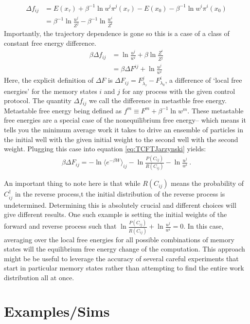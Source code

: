 \documentclass[paper=a4, fontsize=10pt]{article} %
\numberwithin{equation}{section} %
\numberwithin{figure}{section} %
\numberwithin{table}{section} %
\def\avg#1{\langle #1 \rangle}
\begin{document}
\begin{align}
 \Delta f_{ij} &= E(x_\tau) + \beta^{-1} \ln u^j \pi^{j}(x_\tau) -E(x_0) - \beta^{-1} \ln w^i \pi^i(x_0) \\
  &=  \beta^{-1} \ln\frac{u^j}{Z^j}  - \beta^{-1} \ln \frac{w^i}{Z^i} 
\end{align}
Importantly, the trajectory dependence is gone so this is a case of a class of constant free energy difference.
\begin{align}
\beta \Delta f_{ij} &=  \ln \frac{u^j}{w^i}  +  \beta \ln \frac{Z^i}{Z^j} \\
&= \beta \Delta F^{ij} + \ln \frac{u^j}{w^i}
\end{align}
Here, the explicit definition of $\Delta F$ is $\Delta F_{ij} = F^j_{\lambda_\tau} - F^i_{\lambda_0}$, a difference of `local free energies' for the memory states $i$ and $j$ for any process with the given control protocol. The quantity $\Delta f_{ij}$ we call the difference in metastble free energy. Metastable free energy being defined as $f^m \equiv F^m + \beta^{-1} \ln w^m$. These metastable free energies are a special case of the nonequilibrium free energy-- which means it tells you the minimum average work it takes to drive an ensemble of particles in the initial well with the given initial weight to the second well with the second weight. Plugging this case into equation \ref{eq:TCFTJarzynski} yields:
\begin{align}\label{LocalFreeEnergy}
\beta \Delta F_{ij} =  -\ln \avg{e^{-\beta W }}_{ij}- \ln \frac{P(C_{ij})}{R(C_{ij})} - \ln \frac{u^j}{w^i} 
~. 
\end{align}

An important thing to note here is that while $R(C_{ij})$ means the probability of $C_{ij}^{\dagger}$ in the reverse process,t the initial distribution of the reverse process is undetermined. Determining this is absolutely crucial and different choices will give different results. One such example is setting the initial weights of the forward and reverse process such that $ \ln \frac{P(C_{ij})}{R(C_{ij})} + \ln \frac{u^j}{w^i} =0 $. In this case, averaging over the local free energies for all possible combinations of memory states will the equilibrium free energy change of the computation. This approach might be be useful to leverage the accuracy of several careful experiments that start in particular memory states rather than attempting to find the entire work distribution all at once.

\section{Examples/Sims}
\end{document}
